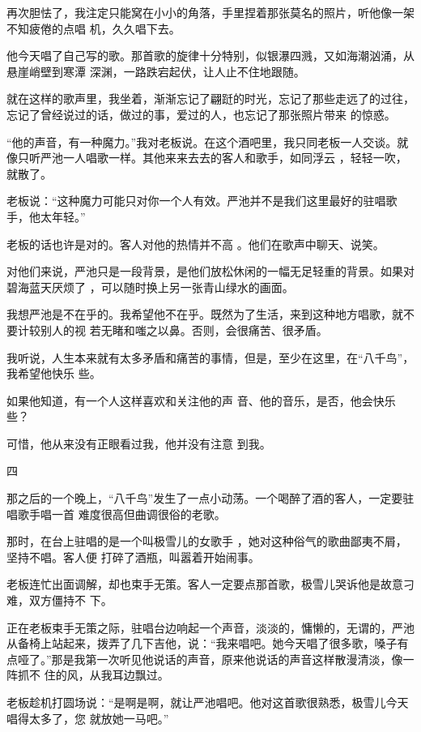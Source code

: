 \documentclass{article}
\begin{document}
再次胆怯了，我注定只能窝在小小的角落，手里捏着那张莫名的照片，听他像一架不知疲倦的点唱
机，久久唱下去。 

他今天唱了自己写的歌。那首歌的旋律十分特别，似银瀑四溅，又如海潮汹涌，从悬崖峭壁到寒潭
深渊，一路跌宕起伏，让人止不住地跟随。 

\newpage

就在这样的歌声里，我坐着，渐渐忘记了翩跹的时光，忘记了那些走远了的过往，忘记了曾经说过的话，做过的事，爱过的人，也忘记了那张照片带来
的惊惑。 

“他的声音，有一种魔力。”我对老板说。在这个酒吧里，我只同老板一人交谈。就像只听严池一人唱歌一样。其他来来去去的客人和歌手，如同浮云
，轻轻一吹，就散了。 

老板说：“这种魔力可能只对你一个人有效。严池并不是我们这里最好的驻唱歌手，他太年轻。”
 

老板的话也许是对的。客人对他的热情并不高
。他们在歌声中聊天、说笑。 

对他们来说，严池只是一段背景，是他们放松休闲的一幅无足轻重的背景。如果对碧海蓝天厌烦了
，可以随时换上另一张青山绿水的画面。 

\newpage

我想严池是不在乎的。我希望他不在乎。既然为了生活，来到这种地方唱歌，就不要计较别人的视
若无睹和嗤之以鼻。否则，会很痛苦、很矛盾。 

我听说，人生本来就有太多矛盾和痛苦的事情，但是，至少在这里，在“八千鸟”，我希望他快乐
些。 

如果他知道，有一个人这样喜欢和关注他的声
音、他的音乐，是否，他会快乐些？ 

可惜，他从来没有正眼看过我，他并没有注意
到我。 


四 

那之后的一个晚上，“八千鸟”发生了一点小动荡。一个喝醉了酒的客人，一定要驻唱歌手唱一首
难度很高但曲调很俗的老歌。 

那时，在台上驻唱的是一个叫极雪儿的女歌手
\newpage
，她对这种俗气的歌曲鄙夷不屑，坚持不唱。客人便
打碎了酒瓶，叫嚣着开始闹事。 

老板连忙出面调解，却也束手无策。客人一定要点那首歌，极雪儿哭诉他是故意刁难，双方僵持不
下。 

正在老板束手无策之际，驻唱台边响起一个声音，淡淡的，慵懒的，无谓的，严池从备椅上站起来，拨弄了几下吉他，说：“我来唱吧。她今天唱了很多歌，嗓子有点哑了。”那是我第一次听见他说话的声音，原来他说话的声音这样散漫清淡，像一阵抓不
住的风，从我耳边飘过。 

老板趁机打圆场说：“是啊是啊，就让严池唱吧。他对这首歌很熟悉，极雪儿今天唱得太多了，您
就放她一马吧。” 
\end{document}
